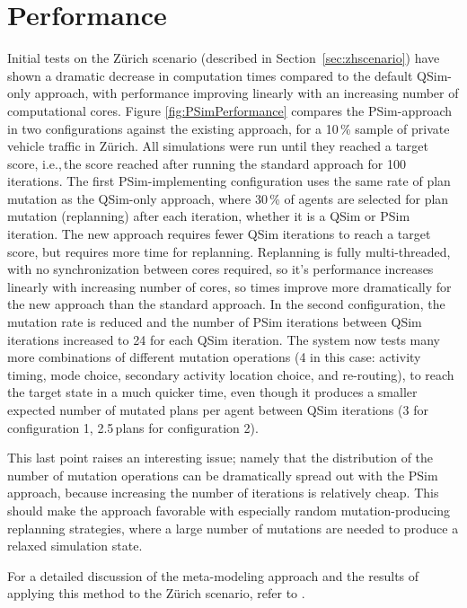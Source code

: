 \section{Performance}
Initial tests on the Zürich scenario (described in Section~\ref{sec:zhscenario}) have shown a dramatic decrease in computation times compared to the default QSim-only approach, with performance improving linearly with an increasing number of computational cores.
Figure \ref{fig:PSimPerformance} compares the PSim-approach in two configurations against the existing approach, for a 10\,\% sample of private vehicle traffic in Zürich. All simulations were run until they reached a target score, i.e.,\,the score reached after running the standard approach for 100\,iterations. The first PSim-implementing configuration uses the same rate of plan mutation as the QSim-only approach, where 30\,\% of agents are selected for plan mutation (replanning) after each iteration, whether it is a QSim or PSim iteration. The new approach requires fewer QSim iterations to reach a target score, but requires more time for replanning. Replanning is fully multi-threaded, with no synchronization between cores required, so it’s performance increases linearly with increasing number of cores, so times improve more dramatically for the new approach than the standard approach.
In the second configuration, the mutation rate is reduced and the number of PSim iterations between QSim iterations increased to 24 for each QSim iteration. The system now tests many more combinations of different mutation operations (4 in this case: activity timing, mode choice, secondary activity location choice, and re-routing), to reach the target state in a much quicker time, even though it produces a smaller expected number of mutated plans per agent between QSim iterations (3 for configuration 1, 2.5\,plans for configuration 2).

This last point raises an interesting issue; namely that the distribution of the number of mutation operations can be dramatically spread out with the PSim approach, because increasing the number of iterations is relatively cheap. This should make the approach favorable with especially random mutation-producing replanning strategies, where a large number of mutations are needed to produce a relaxed simulation state.

For a detailed discussion of the meta-modeling approach and the results of applying this method to the Zürich scenario, refer to \citet[][]{FourieEtAl_TRR_2013}.


